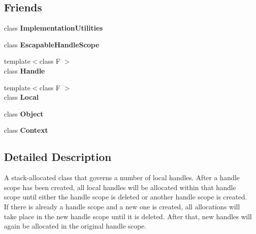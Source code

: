 \subsection*{Friends}
\begin{DoxyCompactItemize}
\item 
\hypertarget{classv8_1_1_handle_scope_ac7b520085953e146d849e05253267f72}{}class {\bfseries Implementation\+Utilities}\label{classv8_1_1_handle_scope_ac7b520085953e146d849e05253267f72}

\item 
\hypertarget{classv8_1_1_handle_scope_ade20a528f8ee42d426959f061cff29ff}{}class {\bfseries Escapable\+Handle\+Scope}\label{classv8_1_1_handle_scope_ade20a528f8ee42d426959f061cff29ff}

\item 
\hypertarget{classv8_1_1_handle_scope_a67ca1a2d91273eaf85fb3d23ba8ce984}{}{\footnotesize template$<$class F $>$ }\\class {\bfseries Handle}\label{classv8_1_1_handle_scope_a67ca1a2d91273eaf85fb3d23ba8ce984}

\item 
\hypertarget{classv8_1_1_handle_scope_afb872edb4aac7ba55f0da004113aa2b0}{}{\footnotesize template$<$class F $>$ }\\class {\bfseries Local}\label{classv8_1_1_handle_scope_afb872edb4aac7ba55f0da004113aa2b0}

\item 
\hypertarget{classv8_1_1_handle_scope_a0720b5f434e636e22a3ed34f847eec57}{}class {\bfseries Object}\label{classv8_1_1_handle_scope_a0720b5f434e636e22a3ed34f847eec57}

\item 
\hypertarget{classv8_1_1_handle_scope_ac26c806e60ca4a0547680edb68f6e39b}{}class {\bfseries Context}\label{classv8_1_1_handle_scope_ac26c806e60ca4a0547680edb68f6e39b}

\end{DoxyCompactItemize}


\subsection{Detailed Description}
A stack-\/allocated class that governs a number of local handles. After a handle scope has been created, all local handles will be allocated within that handle scope until either the handle scope is deleted or another handle scope is created. If there is already a handle scope and a new one is created, all allocations will take place in the new handle scope until it is deleted. After that, new handles will again be allocated in the original handle scope.


